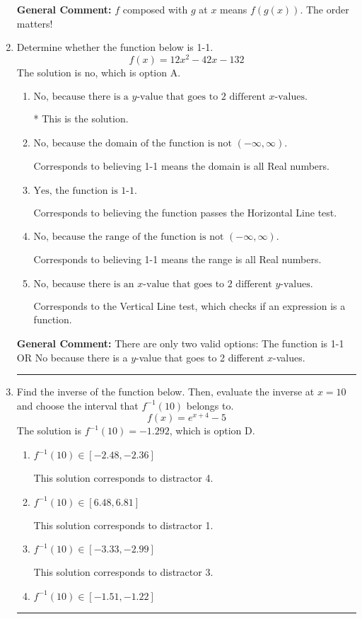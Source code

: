 \documentclass{extbook}[14pt]
\newcommand{\litem}[1]{\item #1

\rule{\textwidth}{0.4pt}}
\begin{document}
\begin{enumerate}
{\begin{enumerate}[label=\Alph*.]
\end{enumerate}

\textbf{General Comment:} $f$ composed with $g$ at $x$ means $f(g(x))$. The order matters!
}
\litem{
Determine whether the function below is 1-1.
\[ f(x) = 12 x^2 - 42 x - 132 \]The solution is \( \text{no} \), which is option A.\begin{enumerate}[label=\Alph*.]
\item \( \text{No, because there is a $y$-value that goes to 2 different $x$-values.} \)

* This is the solution.
\item \( \text{No, because the domain of the function is not $(-\infty, \infty)$.} \)

Corresponds to believing 1-1 means the domain is all Real numbers.
\item \( \text{Yes, the function is 1-1.} \)

Corresponds to believing the function passes the Horizontal Line test.
\item \( \text{No, because the range of the function is not $(-\infty, \infty)$.} \)

Corresponds to believing 1-1 means the range is all Real numbers.
\item \( \text{No, because there is an $x$-value that goes to 2 different $y$-values.} \)

Corresponds to the Vertical Line test, which checks if an expression is a function.
\end{enumerate}

\textbf{General Comment:} There are only two valid options: The function is 1-1 OR No because there is a $y$-value that goes to 2 different $x$-values.
}
\litem{
Find the inverse of the function below. Then, evaluate the inverse at $x = 10$ and choose the interval that $f^{-1}(10)$ belongs to.
\[ f(x) = e^{x+4}-5 \]The solution is \( f^{-1}(10) = -1.292 \), which is option D.\begin{enumerate}[label=\Alph*.]
\item \( f^{-1}(10) \in [-2.48, -2.36] \)

 This solution corresponds to distractor 4.
\item \( f^{-1}(10) \in [6.48, 6.81] \)

 This solution corresponds to distractor 1.
\item \( f^{-1}(10) \in [-3.33, -2.99] \)

 This solution corresponds to distractor 3.
\item \( f^{-1}(10) \in [-1.51, -1.22] \)


\end{enumerate}}
\end{enumerate}
\end{document}
